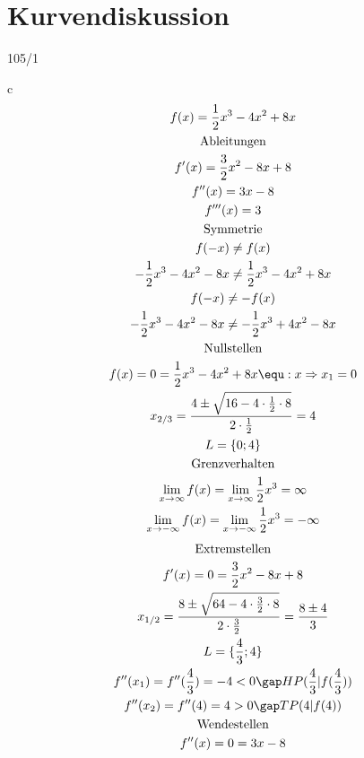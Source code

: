\newpage
\section{Kurvendiskussion}
\begin{exercise}{105/1}
  \item [c]
  \begin{gather*}
    f(x) = \frac{1}{2}x^3 - 4x^2 + 8x \\
    \text{Ableitungen} \\
    f'(x) = \frac{3}{2}x^2 - 8x + 8 \\
    f''(x) = 3x - 8 \\
    f'''(x) = 3 \\
    \text{Symmetrie} \\
    f(-x) \neq f(x) \\
    -\frac{1}{2}x^3 - 4x^2 - 8x \neq \frac{1}{2}x^3 - 4x^2 + 8x \\
    f(-x) \neq -f(x) \\
    -\frac{1}{2}x^3 - 4x^2 - 8x \neq -\frac{1}{2}x^3 + 4x^2 - 8x \\
    \text{Nullstellen} \\
    f(x) = 0 = \frac{1}{2}x^3 - 4x^2 + 8x \equ :x \Rightarrow x_1 = 0 \\
    x_{2/3} = \frac{4 \pm \sqrt{16 - 4 \cdot \frac{1}{2} \cdot 8}}{2 \cdot \frac{1}{2}} = 4 \\
    L = \{0; 4\} \\
    \text{Grenzverhalten} \\
    \lim\limits_{x \to \infty} f(x) = \lim\limits_{x \to \infty} \frac{1}{2}x^3 = \infty \\
    \lim\limits_{x \to -\infty} f(x) = \lim\limits_{x \to -\infty} \frac{1}{2}x^3 = -\infty \\
  \end{gather*}
  \begin{gather*}
    \text{Extremstellen} \\
    f'(x) = 0 = \frac{3}{2}x^2 - 8x + 8 \\
    x_{1/2} = \frac{8 \pm \sqrt{64 - 4 \cdot \frac{3}{2} \cdot 8}}{2 \cdot \frac{3}{2}} = \frac{8 \pm 4}{3} \\
    L = \{\frac{4}{3}; 4\} \\
    f''(x_1) = f''(\frac{4}{3}) = -4 < 0 \gap HP(\frac{4}{3}|f(\frac{4}{3})) \\
    f''(x_2) = f''(4) = 4 > 0 \gap TP(4|f(4)) \\
    \text{Wendestellen} \\
    f''(x) = 0 = 3x - 8 \\

\end{gather*}
\end{exercise}
